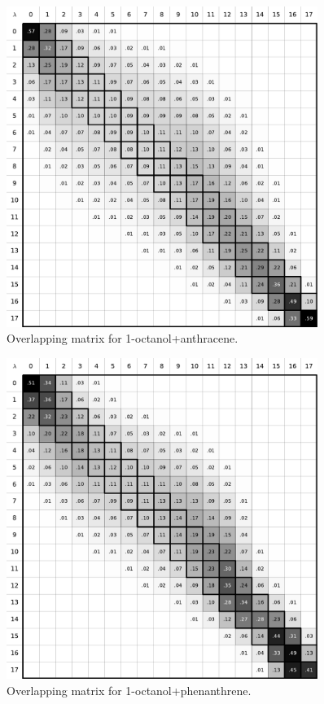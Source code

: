 \documentclass[
	12pt,				%
	openright,			%
	oneside,			%
	a4paper,			%
	english,			%
	brazil				%
	]{abntex2}
\begin{document}
\begin{apendicesenv}
\begin{figure}[H]
	\centering
	\includegraphics[width=0.9\textwidth]{Figures/ooct_ant}
	\caption{Overlapping matrix for 1-octanol+anthracene.}
\end{figure}

\begin{figure}[H]
	\centering
	\includegraphics[width=0.9\textwidth]{Figures/ooct_phen}
	\caption{Overlapping matrix for 1-octanol+phenanthrene.}
\end{figure}


\end{apendicesenv}
\end{document}
